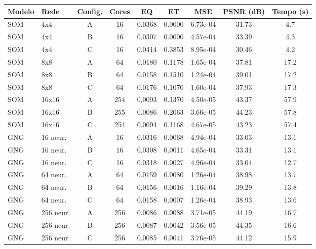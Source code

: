 \begin{tabular}{llccccccc}
\toprule
Modelo & Rede & Config. & Cores & EQ & ET & MSE & PSNR (dB) & Tempo (s)\\
\midrule
SOM & 4x4 & A & 16 & 0.0368 & 0.0000 & 6.73e-04 & 31.73 & 4.7\\
SOM & 4x4 & B & 16 & 0.0307 & 0.0000 & 4.57e-04 & 33.39 & 4.3\\
SOM & 4x4 & C & 16 & 0.0414 & 0.3853 & 8.95e-04 & 30.46 & 4.2\\
\midrule
SOM & 8x8 & A & 64 & 0.0180 & 0.1178 & 1.65e-04 & 37.81 & 17.2\\
SOM & 8x8 & B & 64 & 0.0158 & 0.1510 & 1.24e-04 & 39.01 & 17.2\\
SOM & 8x8 & C & 64 & 0.0176 & 0.1070 & 1.60e-04 & 37.93 & 17.3\\
\midrule
SOM & 16x16 & A & 254 & 0.0093 & 0.1370 & 4.50e-05 & 43.37 & 57.9\\
SOM & 16x16 & B & 255 & 0.0086 & 0.2063 & 3.66e-05 & 44.23 & 57.8\\
SOM & 16x16 & C & 254 & 0.0094 & 0.1168 & 4.67e-05 & 43.23 & 57.4\\
\midrule
GNG & 16 neur. & A & 16 & 0.0316 & 0.0068 & 4.94e-04 & 33.03 & 13.1\\
GNG & 16 neur. & B & 16 & 0.0308 & 0.0011 & 4.65e-04 & 33.31 & 13.1\\
GNG & 16 neur. & C & 16 & 0.0318 & 0.0027 & 4.96e-04 & 33.04 & 12.7\\
\midrule
GNG & 64 neur. & A & 64 & 0.0159 & 0.0080 & 1.26e-04 & 38.98 & 13.7\\
GNG & 64 neur. & B & 64 & 0.0156 & 0.0016 & 1.16e-04 & 39.29 & 13.8\\
GNG & 64 neur. & C & 64 & 0.0158 & 0.0007 & 1.26e-04 & 38.93 & 13.6\\
\midrule
GNG & 256 neur. & A & 256 & 0.0086 & 0.0088 & 3.71e-05 & 44.19 & 16.7\\
GNG & 256 neur. & B & 256 & 0.0087 & 0.0042 & 3.56e-05 & 44.35 & 16.6\\
GNG & 256 neur. & C & 256 & 0.0085 & 0.0041 & 3.76e-05 & 44.12 & 15.9\\
\bottomrule
\end{tabular}
